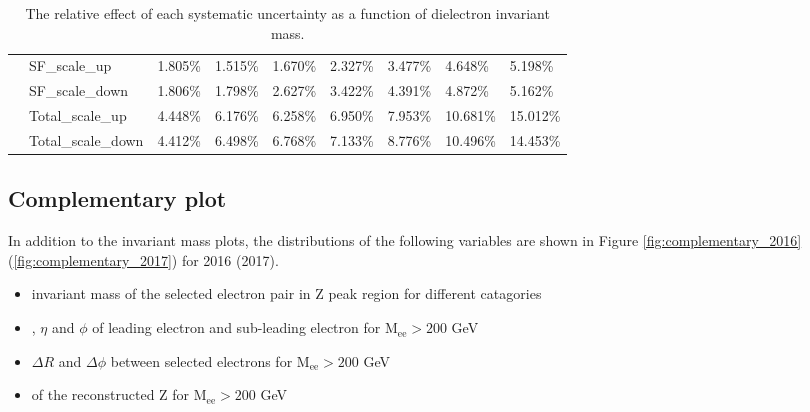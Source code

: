 \begin{table}[!htbp]
\begin{center}
{\begin{tabular}{|l|l|l|l|l|l|l|l|l|}
&SF\_scale\_up               & 1.805\%        & 1.515\%        & 1.670\%        & 2.327\%        & 3.477\%        & 4.648\%        & 5.198\%        \\\cline{2-9}
&SF\_scale\_down             & 1.806\%        & 1.798\%        & 2.627\%        & 3.422\%        & 4.391\%        & 4.872\%        & 5.162\%        \\\cline{2-9}
&Total\_scale\_up            & 4.448\%        & 6.176\%        & 6.258\%        & 6.950\%        & 7.953\%        & 10.681\%        & 15.012\%      \\\cline{2-9}
&Total\_scale\_down          & 4.412\%        & 6.498\%        & 6.768\%        & 7.133\%        & 8.776\%        & 10.496\%        & 14.453\%      \\\hline

\end{tabular}}
\end{center}
\caption{The relative effect of each systematic uncertainty as a function of dielectron invariant mass.}
\label{systematic_effect}
\end{table}



\clearpage
\subsection{Complementary plot}
In addition to the invariant mass plots, the distributions of the following variables are shown in Figure \ref{fig:complementary_2016} (\ref{fig:complementary_2017}) for 2016 (2017).
\begin{itemize}
  \item invariant mass of the selected electron pair in Z peak region for different catagories
  \item \et, $\eta$ and $\phi$ of leading electron and sub-leading electron for $\mathrm{M_{ee}}>200$ GeV
  \item $\Delta R$ and $\Delta\phi$ between selected electrons for $\mathrm{M_{ee}}>200$ GeV
  \item \pt of the reconstructed Z for $\mathrm{M_{ee}}>200$ GeV
\end{itemize}



